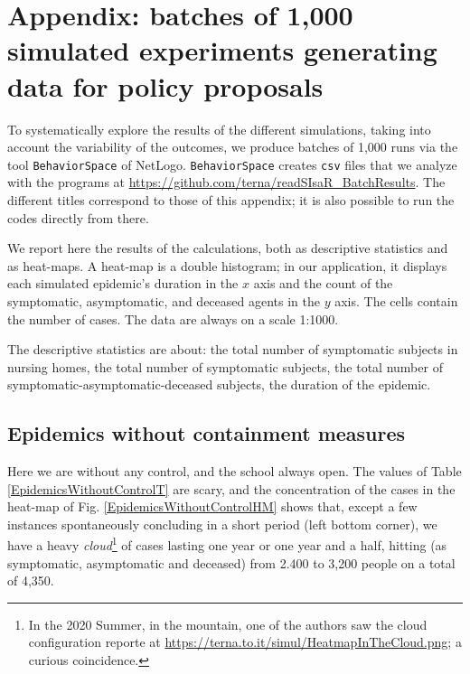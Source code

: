 \documentclass[graybox]{svmult}
\begin{document}
\section{Appendix: batches of 1,000 simulated experiments generating data for policy proposals}
\label{app1000run}

To systematically explore the results of the different simulations, taking into account the variability of the outcomes, we produce batches of 1,000 runs via the tool \verb|BehaviorSpace| of NetLogo. \verb|BehaviorSpace| creates \verb|csv| files that we analyze with the programs at 
\url{https://github.com/terna/readSIsaR_BatchResults}. The different titles correspond to those of this appendix; it is also possible to run the codes directly from there.

We report here the results of the calculations, both as descriptive statistics and as heat-maps. A heat-map is a double histogram; in our application, it displays each simulated epidemic's duration in the $x$ axis and the count of the symptomatic, asymptomatic, and deceased agents in the $y$ axis. The cells contain the number of cases. The data are always on a scale 1:1000.

The descriptive statistics are about: the total number of symptomatic subjects in nursing homes, the total number of symptomatic subjects, the total number of symptomatic-asymptomatic-deceased subjects, the duration of the epidemic.


\subsection{Epidemics without containment measures}
\label{EpidemicsWithoutControlS}

Here we are without any control, and the school always open. The values of Table \ref{EpidemicsWithoutControlT} are scary, and the concentration of the cases in the heat-map of Fig. \ref{EpidemicsWithoutControlHM} shows that, except a few instances spontaneously concluding in a short period (left bottom corner), we have a heavy \emph{cloud}\footnote{In the 2020 Summer, in the mountain, one of the authors saw the cloud configuration reporte at \url{https://terna.to.it/simul/HeatmapInTheCloud.png}; a curious coincidence.} of cases lasting one year or one year and a half, hitting (as symptomatic, asymptomatic and deceased) from 2.400 to 3,200 people on a total of 4,350.
\end{document}
